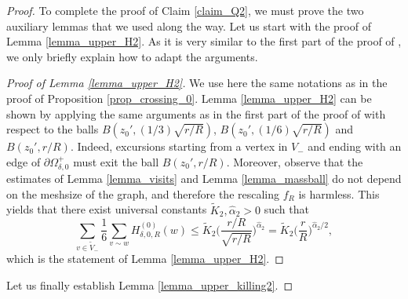 \documentclass{article}
\theoremstyle{definition}
\theoremstyle{remark}
\theoremstyle{remark}
\begin{document}
\begin{proof}
To complete the proof of Claim \ref{claim_Q2}, we must prove the two auxiliary lemmas that we used along the way. Let us start with the proof of Lemma \ref{lemma_upper_H2}. As it is very similar to the first part of the proof of \cite[Proposition~6.3]{HE}, we only briefly explain how to adapt the arguments.

\begin{proof}[Proof of Lemma \ref{lemma_upper_H2}]
We use here the same notations as in the proof of Proposition \ref{prop_crossing_0}. Lemma \ref{lemma_upper_H2} can be shown by applying the same arguments as in the first part of the proof of \cite[Proposition~6.3]{HE} with respect to the balls $B(z_0', (1/3)\sqrt{r/R})$, $B(z_0', (1/6)\sqrt{r/R})$ and $B(z_0',r/R)$. Indeed, excursions starting from a vertex in $V_{-}$ and ending with an edge of $\partial \Omega_{\delta,0}^{+}$ must exit the ball $B(z_0',r/R)$. Moreover, observe that the estimates of Lemma \ref{lemma_visits} and Lemma \ref{lemma_massball} do not depend on the meshsize of the graph, and therefore the rescaling $f_R$ is harmless. This yields that there exist universal constants $\tilde K_2, \hat \alpha_2 >0$ such that
\begin{equation} %
    \sum_{v \in \tilde V_{-}} \frac{1}{6} \sum_{v \sim w} H_{\delta, 0, R}^{(0)}(w) \leq \tilde K_{2} \bigg( \frac{r/R}{\sqrt{r/R}}\bigg)^{\hat \alpha_2} = \tilde K_{2} \bigg( \frac{r}{R} \bigg)^{\hat \alpha_2 /2},
\end{equation}
which is the statement of Lemma \ref{lemma_upper_H2}.
\end{proof}

Let us finally establish Lemma \ref{lemma_upper_killing2}.


\end{proof}
\end{document}
